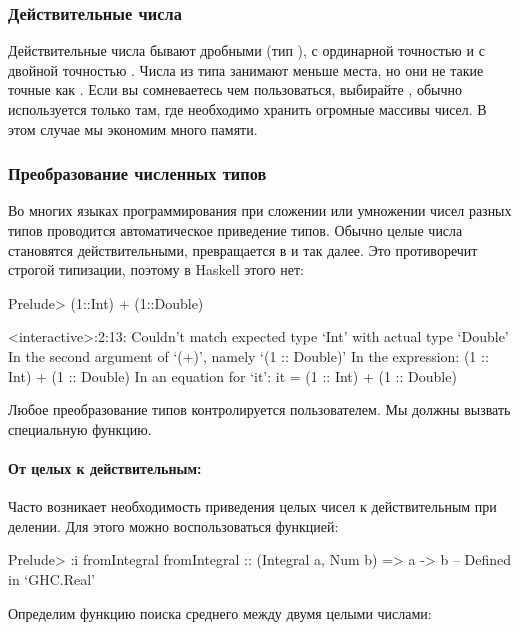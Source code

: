 \subsubsection{Действительные числа}

Действительные числа бывают дробными (тип ),
с ординарной точностью  и с двойной точностью 
. Числа из типа  занимают меньше места,
но они не такие точные как . Если вы сомневаетесь 
чем пользоваться, выбирайте , обычно
 используется только там, где необходимо хранить огромные
массивы чисел. В этом случае мы экономим много памяти. 

\subsubsection{Преобразование численных типов}

Во многих языках программирования при сложении или умножении
чисел разных типов проводится автоматическое приведение 
типов. Обычно целые числа становятся действительными,
 превращается в  и так далее. 
Это противоречит строгой типизации, поэтому
в Haskell этого нет:

\begin{code}
Prelude> (1::Int) + (1::Double)

<interactive>:2:13:
    Couldn't match expected type `Int' with actual type `Double'
    In the second argument of `(+)', namely `(1 :: Double)'
    In the expression: (1 :: Int) + (1 :: Double)
    In an equation for `it': it = (1 :: Int) + (1 :: Double)
\end{code}

Любое преобразование типов контролируется пользователем. 
Мы должны вызвать специальную функцию.

\paragraph{От целых к действительным:} Часто возникает
необходимость приведения целых чисел к действительным
при делении. Для этого можно воспользоваться функцией:

\begin{code}
Prelude> :i fromIntegral
fromIntegral :: (Integral a, Num b) => a -> b
  	-- Defined in `GHC.Real'
\end{code}

Определим функцию поиска среднего между двумя целыми числами:

